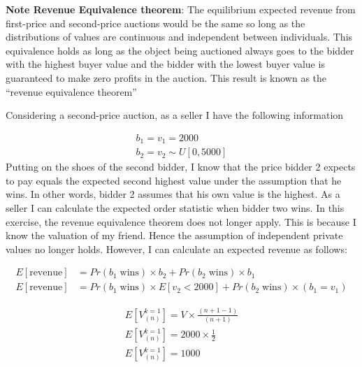 \documentclass[11pt]{article} %
\begin{document}
        \textbf{Note Revenue Equivalence theorem}: The equilibrium expected revenue from first-price and second-price auctions would be the same so long as the distributions of values are continuous and independent between individuals. This equivalence holds as long as the object being auctioned always goes to the bidder with the highest buyer value and the bidder with the lowest buyer value is guaranteed to make zero profits in the auction. This result is known as the “revenue equivalence theorem”
        
        Considering a second-price auction, as a seller I have the following information

        \begin{align*}
             b_1 = v_1 = 2000 \\
             b_2 = v_2 \sim U[0,5000]
        \end{align*}
        Putting on the shoes of the second bidder, I know that the price bidder 2 expects to pay equals the expected second highest value under the assumption that he wins. In other words, bidder 2 assumes that his own value is the highest. As a seller I can calculate the expected order statistic when bidder two wins.
%        
        In this exercise, the revenue equivalence theorem does not longer apply. This is because I know the valuation of my friend. Hence the assumption of independent private values no longer holds. However, I can calculate an expected revenue as follows:

        \begin{align*}
            E[\text{revenue}] & = Pr(b_1 \; \text{wins}) \times b_2+ Pr(b_2 \; \text{wins}) \times b_1 \\
            E[\text{revenue}] & = Pr(b_1 \; \text{wins}) \times E[v_2<2000] + Pr(b_2 \; \text{wins}) \times (b_1= v_1)
         \end{align*}


        \begin{align*}
            E[V^{k=1}_{(n)}] = V \times \frac{(n + 1 - 1)}{(n+1)} \\ 
            E[V^{k=1}_{(n)}] = 2000 \times \frac{1}{2} \\
            E[V^{k=1}_{(n)}] = 1000
        \end{align*}
        
\end{document}
